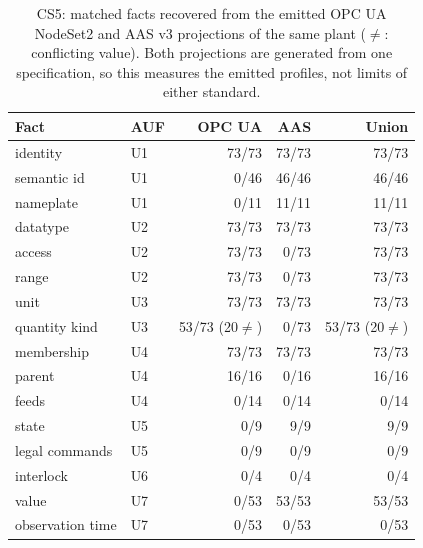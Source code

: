 \begin{table}[t]
\centering\footnotesize
\setlength{\tabcolsep}{3pt}
\caption{CS5: matched facts recovered from the emitted OPC UA NodeSet2 and AAS v3 projections of the same plant ($\neq$: conflicting value). Both projections are generated from one specification, so this measures the emitted profiles, not limits of either standard.}
\label{tab:cs5}
\begin{tabular}{@{}llrrr@{}}
\toprule
Fact & AUF & OPC UA & AAS & Union \\
\midrule
identity & U1 & 73/73 & 73/73 & 73/73 \\
semantic id & U1 & 0/46 & 46/46 & 46/46 \\
nameplate & U1 & 0/11 & 11/11 & 11/11 \\
datatype & U2 & 73/73 & 73/73 & 73/73 \\
access & U2 & 73/73 & 0/73 & 73/73 \\
range & U2 & 73/73 & 0/73 & 73/73 \\
unit & U3 & 73/73 & 73/73 & 73/73 \\
quantity kind & U3 & 53/73 (20$\neq$) & 0/73 & 53/73 (20$\neq$) \\
membership & U4 & 73/73 & 73/73 & 73/73 \\
parent & U4 & 16/16 & 0/16 & 16/16 \\
feeds & U4 & 0/14 & 0/14 & 0/14 \\
state & U5 & 0/9 & 9/9 & 9/9 \\
legal commands & U5 & 0/9 & 0/9 & 0/9 \\
interlock & U6 & 0/4 & 0/4 & 0/4 \\
value & U7 & 0/53 & 53/53 & 53/53 \\
observation time & U7 & 0/53 & 0/53 & 0/53 \\
\bottomrule
\end{tabular}
\end{table}

